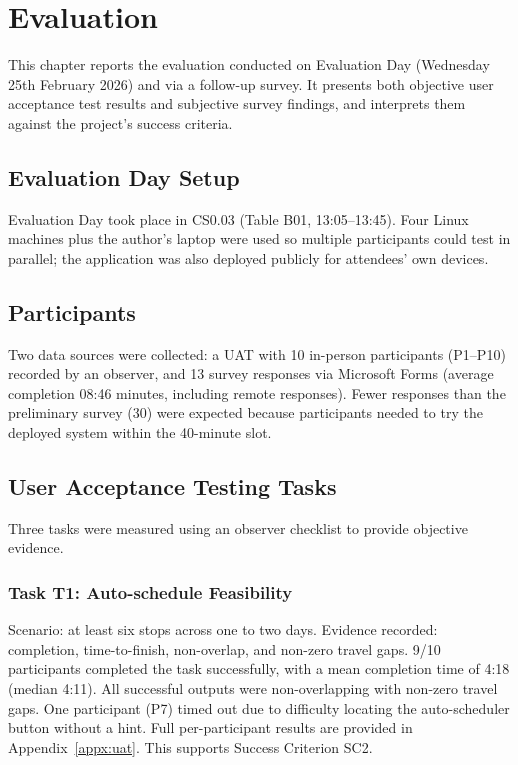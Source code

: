 \chapter{Evaluation}
\label{ch:evaluation}

This chapter reports the evaluation conducted on Evaluation Day (Wednesday 25th
February 2026) and via a follow-up survey. It presents both objective user
acceptance test results and subjective survey findings, and interprets them
against the project's success criteria.

\section{Evaluation Day Setup}
Evaluation Day took place in CS0.03 (Table B01, 13:05--13:45). Four Linux machines plus the author's laptop were used so multiple participants could test in parallel; the application was also deployed publicly for attendees' own devices.

\section{Participants}
Two data sources were collected: a UAT with 10 in-person participants (P1--P10) recorded by an observer, and 13 survey responses via Microsoft Forms (average completion 08:46 minutes, including remote responses). Fewer responses than the preliminary survey (30) were expected because participants needed to try the deployed system within the 40-minute slot.

\section{User Acceptance Testing Tasks}
Three tasks were measured using an observer checklist to provide objective
evidence.

\subsection{Task T1: Auto-schedule Feasibility}
Scenario: at least six stops across one to two days. Evidence recorded:
completion, time-to-finish, non-overlap, and non-zero travel gaps.
9/10 participants completed the task successfully, with a mean completion time of
4:18 (median 4:11). All successful outputs were non-overlapping with non-zero
travel gaps. One participant (P7) timed out due to difficulty locating the
auto-scheduler button without a hint. Full per-participant results are provided
in Appendix~\ref{appx:uat}. This supports Success Criterion SC2.

